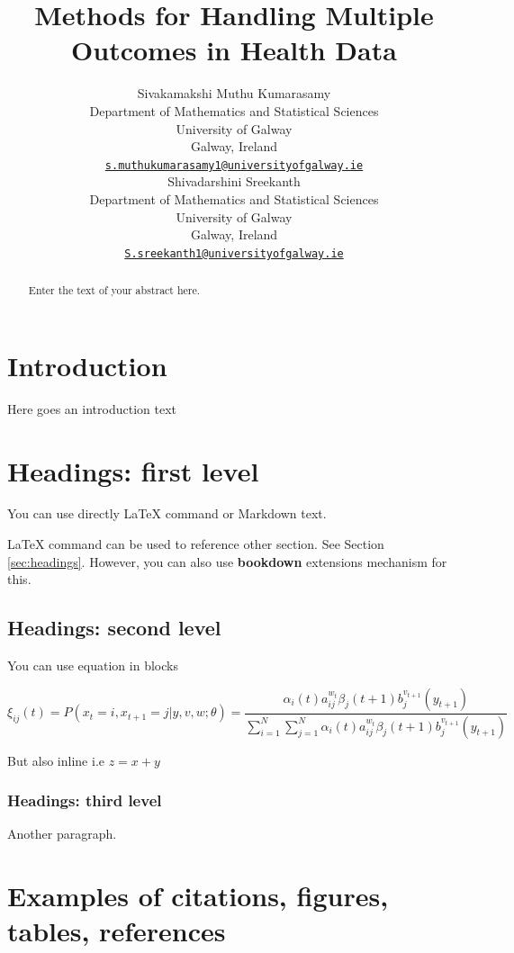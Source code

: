 \documentclass{article}
\title{Methods for Handling Multiple Outcomes in Health Data}
\author{
    Sivakamakshi Muthu Kumarasamy
   \\
    Department of Mathematics and Statistical Sciences \\
    University of Galway \\
  Galway, Ireland \\
  \texttt{\href{mailto:s.muthukumarasamy1@universityofgalway.ie}{\nolinkurl{s.muthukumarasamy1@universityofgalway.ie}}} \\
   \And
    Shivadarshini Sreekanth
   \\
    Department of Mathematics and Statistical Sciences \\
    University of Galway \\
  Galway, Ireland \\
  \texttt{\href{mailto:S.sreekanth1@universityofgalway.ie}{\nolinkurl{S.sreekanth1@universityofgalway.ie}}} \\
  }
\begin{document}
\maketitle


\begin{abstract}
Enter the text of your abstract here.
\end{abstract}


\section{Introduction}\label{introduction}

Here goes an introduction text

\section{Headings: first level}\label{headings-first-level}

\label{sec:headings}

You can use directly LaTeX command or Markdown text.

LaTeX command can be used to reference other section. See Section
\ref{sec:headings}. However, you can also use \textbf{bookdown}
extensions mechanism for this.

\subsection{Headings: second level}\label{headings-second-level}

You can use equation in blocks

\[
\xi _{ij}(t)=P(x_{t}=i,x_{t+1}=j|y,v,w;\theta)= {\frac {\alpha _{i}(t)a^{w_t}_{ij}\beta _{j}(t+1)b^{v_{t+1}}_{j}(y_{t+1})}{\sum _{i=1}^{N} \sum _{j=1}^{N} \alpha _{i}(t)a^{w_t}_{ij}\beta _{j}(t+1)b^{v_{t+1}}_{j}(y_{t+1})}}
\]

But also inline i.e \(z=x+y\)

\subsubsection{Headings: third level}\label{headings-third-level}

Another paragraph.

\section{Examples of citations, figures, tables,
references}\label{examples-of-citations-figures-tables-references}
\end{document}
